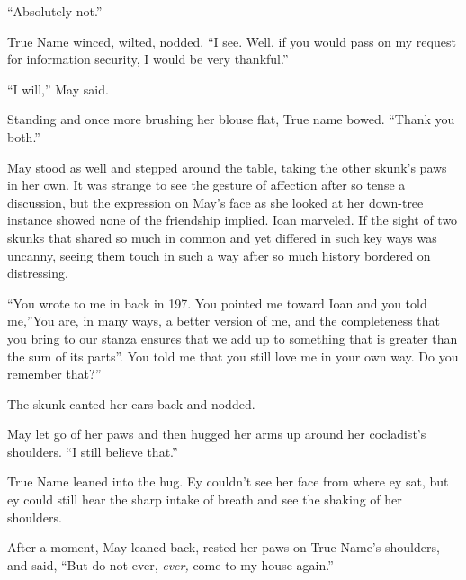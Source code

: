 ``Absolutely not.''

True Name winced, wilted, nodded. ``I see. Well, if you would pass on my request for information security, I would be very thankful.''

``I will,'' May said.

Standing and once more brushing her blouse flat, True name bowed. ``Thank you both.''

May stood as well and stepped around the table, taking the other skunk's paws in her own. It was strange to see the gesture of affection after so tense a discussion, but the expression on May's face as she looked at her down-tree instance showed none of the friendship implied. Ioan marveled. If the sight of two skunks that shared so much in common and yet differed in such key ways was uncanny, seeing them touch in such a way after so much history bordered on distressing.

``You wrote to me in back in 197. You pointed me toward Ioan and you told me,''You are, in many ways, a better version of me, and the completeness that you bring to our stanza ensures that we add up to something that is greater than the sum of its parts''. You told me that you still love me in your own way. Do you remember that?''

The skunk canted her ears back and nodded.

May let go of her paws and then hugged her arms up around her cocladist's shoulders. ``I still believe that.''

True Name leaned into the hug. Ey couldn't see her face from where ey sat, but ey could still hear the sharp intake of breath and see the shaking of her shoulders.

After a moment, May leaned back, rested her paws on True Name's shoulders, and said, ``But do not ever, \emph{ever,} come to my house again.''
